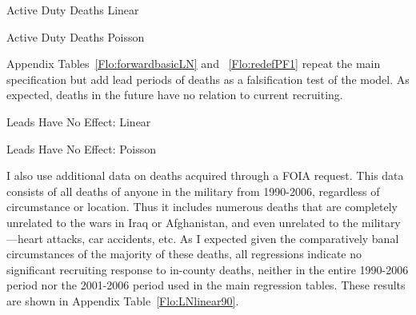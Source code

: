 \documentclass[12pt] {article}
\begin{document}
\pagebreak{}
\clearpage{}
\begin{table}
\caption{Active Duty Deaths Linear}
\label{Flo:Rdeathslinear}
\scalebox{0.9}{

}
\end{table}


\begin{table}
\caption{Active Duty Deaths Poisson}
\label{Flo:RdeathsP} 
\end{table}


Appendix Tables~\ref{Flo:forwardbasicLN} and ~\ref{Flo:redefPF1} repeat the main specification but add lead periods of deaths as a falsification test of the model. As expected, deaths in the future have no relation to current recruiting. 


\pagebreak{}
\clearpage{}
\begin{table}
\caption{Leads Have No Effect: Linear}
\label{Flo:forwardbasicLN}
\scalebox{0.8}{
}
\end{table}

\pagebreak{}
\clearpage{}
\begin{table}
\caption{Leads Have No Effect: Poisson}
\label{Flo:redefPF1}
\end{table}


I also use additional data on deaths acquired through a FOIA request. This data consists of all deaths of anyone in the military from 1990-2006, regardless of circumstance or location. Thus it includes numerous deaths that are completely unrelated to the wars in Iraq or Afghanistan, and even unrelated to the military---heart attacks, car accidents, etc. As I expected given the comparatively banal circumstances of the majority of these deaths, all regressions indicate no significant recruiting response to in-county deaths, neither in the entire 1990-2006 period nor the 2001-2006 period used in the main regression tables. These results are shown in Appendix Table~\ref{Flo:LNlinear90}.%

\begin{table}
\caption{}
\label{Flo:LNlinear90}
\scalebox{0.8}{
}
\end{table}

\end{document}
